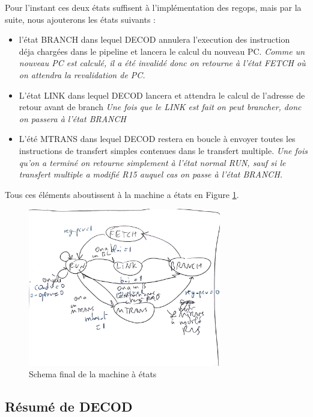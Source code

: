 \documentclass{article}
\begin{document}
Pour l'instant ces deux états suffisent à l'implémentation des regops, mais par la suite,
nous ajouterons les états suivants :
\begin{itemize}
 \item l'état BRANCH dans lequel DECOD annulera l'execution des instruction déja chargées dans le pipeline
       et lancera le calcul du nouveau PC.
       \textit{Comme un nouveau PC est calculé, il a été invalidé donc on retourne à l'état FETCH où on attendra
       la revalidation de PC.}
 \item L'état LINK dans lequel DECOD lancera et attendra le calcul de l'adresse de retour avant de branch
       \textit{Une fois que le LINK est fait on peut brancher, donc on passera à l'état BRANCH}
 \item L'été MTRANS dans lequel DECOD restera en boucle à envoyer toutes les instructions de transfert simples
       contenues dans le transfert multiple.
       \textit{Une fois qu'on a terminé on retourne simplement à l'état normal RUN, sauf si le transfert multiple a
       modifié R15 auquel cas on passe à l'état BRANCH.}
\end{itemize}

Tous ces éléments aboutissent à la machine a états en Figure \ref{mae}.

\begin{figure}[H]
\includegraphics[width=0.75\textwidth]{pics/mae.png}
\centering
\caption{Schema final de la machine à états}
\label{mae}
\end{figure}

\subsection{Résumé de DECOD}
\end{document}
